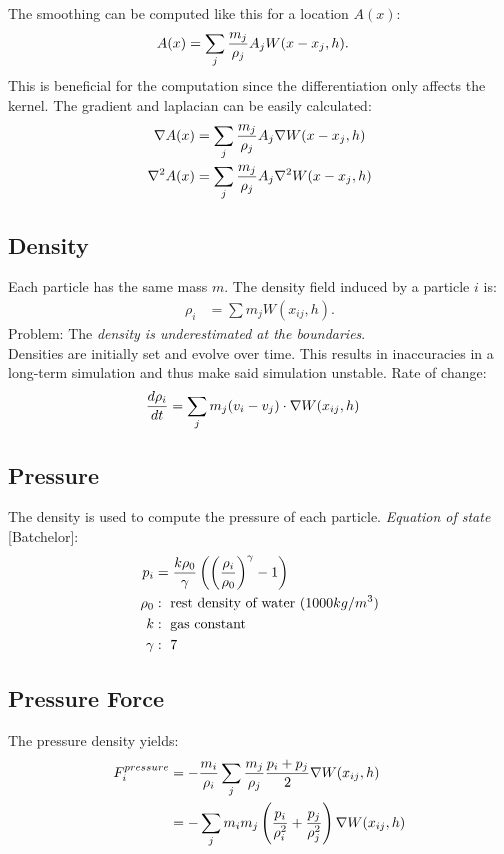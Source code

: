 \begin{multicols}{2}
The smoothing can be computed like this for a location $A(x)$:
\begin{align*}
	 A(x) &= \sum_j {m_j\over \rho_j} A_j W(x-x_j, h).
\end{align*}
This is beneficial for the computation since the differentiation only affects the kernel. The gradient and laplacian can be easily calculated:
\begin{align*}
	 \nabla A(x) &= \sum_j {m_j\over \rho_j} A_j \nabla W(x-x_j, h)\\
	 \nabla^2 A(x) &= \sum_j {m_j\over \rho_j} A_j \nabla^2 W(x-x_j, h)\\
\end{align*}
\subsection{Density}
Each particle has the same mass $m$. The density field induced by a particle $i$ is:
\begin{align*}
	\rho_i &= \sum m_j W(x_{ij},h).
\end{align*}
Problem: The \emph{density is underestimated at the boundaries}. \\

Densities are initially set and evolve over time. This results in inaccuracies in a long-term simulation and thus make said simulation unstable.
Rate of change:
\begin{align*}
	{d \rho_i \over dt} &= \sum_j m_j (v_i - v_j) \cdot \nabla W(x_{ij}, h)
\end{align*}

\subsection{Pressure}
The density is used to compute the pressure of each particle. \emph{Equation of state} [Batchelor]:
\begin{align*}
	p_i &= {k\rho_0 \over \gamma} \left(\left( {\rho_i \over \rho_0 }\right)^\gamma - 1 \right)\\
	\rho_0 &: \text{ rest density of water ($1000 kg/m^3$)}\\
	k &: \text{ gas constant}\\
	\gamma &: \ 7
\end{align*}

\subsection{Pressure Force} 
The pressure density yields:
\begin{align*}
 F_i^{pressure} &= - {m_i \over \rho_i} \sum_j {m_j\over \rho_j} {p_i + p_j \over 2} \nabla W(x_{ij}, h)\\
&= - \sum_j {m_i m_j}\left( {p_i\over \rho_i^2} + {p_j \over \rho_j^2} \right) \nabla W(x_{ij}, h)\\
\end{align*}


\end{multicols}
